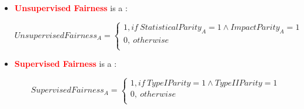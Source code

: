 \begin{itemize}
\item [-] \textbf{\textcolor{red}{Unsupervised Fairness}} is a :
       
$$Unsupervised Fairness_A = \begin{cases}
      1, if \ Statistical Parity_A = 1 \land Impact Parity_A = 1
 \\
      0, \ otherwise \\
    \end{cases}
    $$ 

\item [-] \textbf{\textcolor{red}{Supervised Fairness}} is a :
       
$$Supervised Fairness_A = \begin{cases}
      1, if \ Type I Parity = 1 \land Type II Parity = 1
 \\
      0, \ otherwise \\
    \end{cases}
    $$ 

\end{itemize}
\fi

